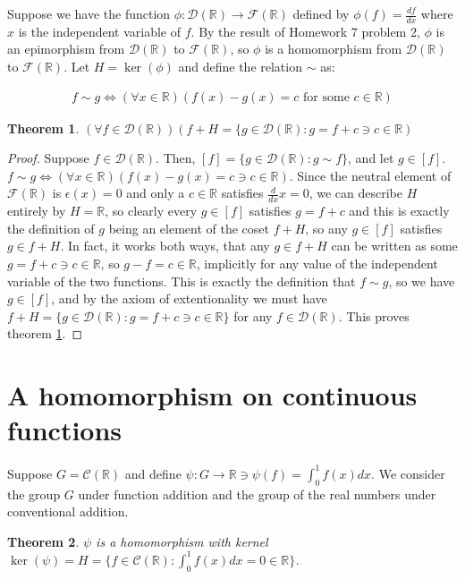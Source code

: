 \documentclass[12pt]{article}
\newcommand{\reals}{\mathbb{R}}
\newcommand{\freals}{\mathcal{F}(\reals)}
\newcommand{\dreals}{\mathcal{D}(\reals)}
\newcommand{\creals}{\mathcal{C}(\reals)}
\newtheorem{thm}{Theorem}
\begin{document}
Suppose we have
the function $\phi: \dreals \to \freals$
defined by $\phi(f) = \frac{df}{dx}$
where $x$ is the independent variable of $f$.
By the result of Homework 7 problem 2,
$\phi$ is an epimorphism from $\dreals$ to $\freals$,
so $\phi$ is a homomorphism from $\dreals$ to $\freals$.
Let $H = \ker(\phi)$ and define the relation $\sim$ as:

\begin{align} \label{sim}
	f \sim g \iff (\forall x \in \reals)(f(x) - g(x) = c \text{ for some } c \in \reals)
\end{align}

\begin{thm} \label{thm8}
	$(\forall f \in \dreals)(f + H = \{g \in \dreals: g = f + c \ni c \in \reals)$
\end{thm}

\begin{proof}
	Suppose $f \in \dreals$.
	Then, $[f] = \{g \in \dreals: g \sim f \}$, and let $g \in [f]$.
	$f \sim g \iff (\forall x \in \reals)(f(x) - g(x) = c \ni c \in \reals)$.
	Since the neutral element of $\freals$ is $\epsilon(x) = 0$ and
	only a $c \in \reals$ satisfies $\frac{d}{dx} x = 0$,
	we can describe $H$ entirely by $H = \reals$,
	so clearly every $g \in [f]$ satisfies $g = f + c$
	and this is exactly the definition of $g$ being
	an element of the coset $f + H$,
	so any $g \in [f]$ satisfies $g \in f + H$.
	In fact, it works both ways, that any
	$g \in f + H$ can be written as some $g = f + c \ni c \in \reals$,
	so $g - f = c \in \reals$, implicitly for any value of
	the independent variable of the two functions.
	This is exactly the definition that $f \sim g$,
	so we have $g \in [f]$,
	and by the axiom of extentionality
	we must have $f + H = \{g \in \dreals: g = f + c \ni c \in \reals\}$
	for any $f \in \dreals$. This proves theorem \ref{thm8}.
\end{proof}

\section{A homomorphism on continuous functions}

Suppose $G = \creals$ and define $\psi: G \to \reals \ni \psi(f) = \int_0^1 f(x)dx$.
We consider the group $G$ under function addition
and the group of the real numbers under conventional addition.

\begin{thm} \label{thm9}
	$\psi$ is a homomorphism with kernel $\ker(\psi) = H = \{f \in \creals: \int_0^1 f(x)dx = 0 \in \reals\}$.
\end{thm}
\end{document}
